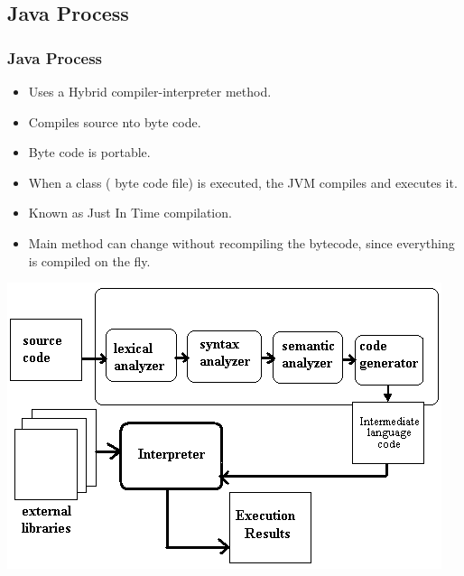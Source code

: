 \documentclass{beamer}
\begin{document}
\subsection{Java Process}
\begin{frame}
\frametitle{Java Process}
\begin{itemize}
\item Uses a {\color{red} Hybrid compiler-interpreter} method.
\item Compiles source nto {\color{green} byte code}.
\item {\color{green} Byte code} is portable.
\item When a class ({\color{green} byte code} file) is executed, the JVM {\color{orange} compiles} and {\color{purple} executes} it.
\item Known as {\color{magenta} Just In Time} compilation.
\item Main method can change without recompiling the bytecode, since everything is compiled on the fly.
\end{itemize}
\includegraphics[scale=0.3]{inter.png}
\end{frame}
\end{document}

